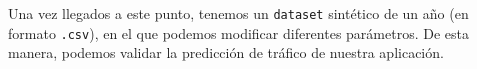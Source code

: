 \documentclass[a4paper, oneside, 12pt]{book}
\begin{document}
\begin{enumerate}
		\noindent Una vez llegados a este punto, tenemos un \texttt{dataset} sintético de un año (en formato \texttt{.csv}), en el que podemos modificar diferentes parámetros. De esta manera, podemos validar la predicción de tráfico de nuestra aplicación. \\
	\end{enumerate}
	
\end{document}
